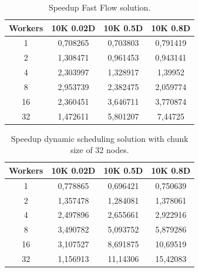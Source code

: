 \begin{table}[]
\centering
\begin{tabular}{|c|c|c|c|}
\hline
Workers & 10K 0.02D & 10K 0.5D & 10K 0.8D \\ \hline
1       & 0,708265  & 0,703803 & 0,791419 \\ \hline
2       & 1,308471  & 0,961453 & 0,943141 \\ \hline
4       & 2,303997  & 1,328917 & 1,39952  \\ \hline
8       & 2,953739  & 2,382475 & 2,059774 \\ \hline
16      & 2,360451  & 3,646711 & 3,770874 \\ \hline
32      & 1,472611  & 5,801207 & 7,44725  \\ \hline
\end{tabular}
\caption{Speedup Fast Flow solution.}
\label{table:spup_ff}
\end{table}
\FloatBarrier

\begin{table}[htb!]
\centering
\begin{tabular}{|c|c|c|c|}
\hline
Workers & 10K 0.02D & 10K 0.5D & 10K 0.8D \\ \hline
1       & 0,778865  & 0,696421 & 0,750639 \\ \hline
2       & 1,357478  & 1,284081 & 1,378061 \\ \hline
4       & 2,497896  & 2,655661 & 2,922916 \\ \hline
8       & 3,490782  & 5,093752 & 5,879286 \\ \hline
16      & 3,107527  & 8,691875 & 10,69519 \\ \hline
32      & 1,156913  & 11,14306 & 15,42083 \\ \hline
\end{tabular}
\caption{Speedup dynamic scheduling solution with chunk size of 32 nodes.}
\label{table:spup_dy}
\end{table}
\FloatBarrier
\newpage